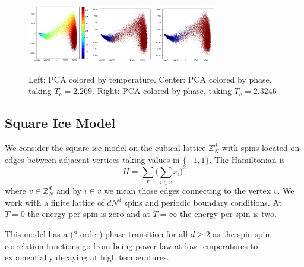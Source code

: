 \documentclass[11pt]{article}
\begin{document}
\begin{figure}[h]
    \centering
    \includegraphics[width=0.24\textwidth]{ising_images/pca_2d_ising}
    \includegraphics[width=0.24\textwidth]{ising_images/pca_phase_2d_ising}
    \includegraphics[width=0.24\textwidth]{ising_images/pca_phase2_2d_ising}
    \caption{Left: PCA colored by temperature. Center: PCA colored by phase, taking $T_\text{c}=2.269$. Right: PCA colored by phase, taking $T_\text{c}=2.3246$}
    \label{fig:IsingPCA}
\end{figure}


\subsection{Square Ice Model}
We consider the square ice model on the cubical lattice $\mathbb{Z}_N^d$ with spins located on edges between adjacent vertices taking values in $\{{-1},1\}$. The Hamiltonian is
\begin{equation}
    H = \sum_v\Big(\sum_{i\in v}s_i\Big)^2
\end{equation}
where $v\in\mathbb{Z}_N^d$ and by $i\in v$ we mean those edges connecting to the vertex $v$. We work with a finite lattice of $dN^d$ spins and periodic boundary conditions. At $T=0$ the energy per spin is zero and at $T=\infty$ the energy per spin is two.

This model has a (?-order) phase transition for all $d\geq 2$ as the spin-spin correlation functions go from being power-law at low temperatures to exponentially decaying at high temperatures.
\end{document}
